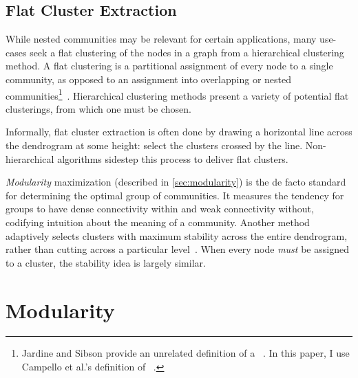 \subsection{Flat Cluster Extraction} \label{sec:flat cluster extraction}

While nested communities may be relevant for certain applications, many use-cases seek a flat clustering of the nodes in a graph from a hierarchical clustering method. A flat clustering is a partitional assignment of every node to a single community, as opposed to an assignment into overlapping or nested communities\footnote{Jardine and Sibson provide an unrelated definition of a ~\cite{jardine1971mathematical}. In this paper, I use Campello et al.'s definition of ~\cite{campello2013framework}.}~\cite{campello2013framework}. Hierarchical clustering methods present a variety of potential flat clusterings, from which one must be chosen.

Informally, flat cluster extraction is often done by drawing a horizontal line across the dendrogram at some height: select the clusters crossed by the line. Non-hierarchical algorithms sidestep this process to deliver flat clusters.

\emph{Modularity} maximization (described in \autoref{sec:modularity}) is the de facto standard for determining the optimal group of communities. It measures the tendency for groups to have dense connectivity within and weak connectivity without, codifying intuition about the meaning of a community. 
Another method adaptively selects clusters with maximum stability across the entire dendrogram, rather than cutting across a particular level~\cite{campello2013density}. When every node \emph{must} be assigned to a cluster, the stability idea is largely similar.



\section{Modularity} \label{sec:modularity}

